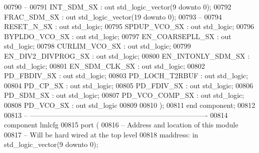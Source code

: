 \begin{DoxyCode}
00790 \textcolor{keyword}{        --}
00791         INT\_SDM\_SX  : \textcolor{keywordflow}{out} \textcolor{comment}{std\_logic\_vector}(\textcolor{vhdllogic}{}\textcolor{vhdllogic}{9} \textcolor{keywordflow}{downto} \textcolor{vhdllogic}{}\textcolor{vhdllogic}{0});
00792         FRAC\_SDM\_SX : \textcolor{keywordflow}{out} \textcolor{comment}{std\_logic\_vector}(\textcolor{vhdllogic}{}\textcolor{vhdllogic}{19} \textcolor{keywordflow}{downto} \textcolor{vhdllogic}{}\textcolor{vhdllogic}{0});
00793 \textcolor{keyword}{        --}
00794         RESET\_N\_SX                  : \textcolor{keywordflow}{out} \textcolor{comment}{std\_logic};
00795         SPDUP\_VCO\_SX                : \textcolor{keywordflow}{out} \textcolor{comment}{std\_logic};
00796         BYPLDO\_VCO\_SX               : \textcolor{keywordflow}{out} \textcolor{comment}{std\_logic};
00797         EN\_COARSEPLL\_SX         : \textcolor{keywordflow}{out} \textcolor{comment}{std\_logic};
00798         CURLIM\_VCO\_SX               : \textcolor{keywordflow}{out} \textcolor{comment}{std\_logic};
00799         EN\_DIV2\_DIVPROG\_SX  : \textcolor{keywordflow}{out} \textcolor{comment}{std\_logic};
00800         EN\_INTONLY\_SDM\_SX       : \textcolor{keywordflow}{out} \textcolor{comment}{std\_logic};
00801         EN\_SDM\_CLK\_SX               : \textcolor{keywordflow}{out} \textcolor{comment}{std\_logic};
00802         PD\_FBDIV\_SX             : \textcolor{keywordflow}{out} \textcolor{comment}{std\_logic};
00803         PD\_LOCH\_T2RBUF          : \textcolor{keywordflow}{out} \textcolor{comment}{std\_logic};
00804         PD\_CP\_SX                        : \textcolor{keywordflow}{out} \textcolor{comment}{std\_logic};
00805         PD\_FDIV\_SX                  : \textcolor{keywordflow}{out} \textcolor{comment}{std\_logic};
00806         PD\_SDM\_SX                       : \textcolor{keywordflow}{out} \textcolor{comment}{std\_logic};
00807         PD\_VCO\_COMP\_SX          : \textcolor{keywordflow}{out} \textcolor{comment}{std\_logic};
00808         PD\_VCO\_SX                       : \textcolor{keywordflow}{out} \textcolor{comment}{std\_logic}     
00809 
00810     );
00811 \textcolor{keywordflow}{end} \textcolor{keywordflow}{component};
00812 
00813 \textcolor{keyword}{-- ----------------------------------------------------------------------------}
00814 \textcolor{keywordflow}{component} lmlcfg
00815     \textcolor{keywordflow}{port} (
00816 \textcolor{keyword}{        -- Address and location of this module}
00817 \textcolor{keyword}{        -- Will be hard wired at the top level}
00818         maddress: \textcolor{keywordflow}{in} \textcolor{comment}{std\_logic\_vector}(\textcolor{vhdllogic}{}\textcolor{vhdllogic}{9} \textcolor{keywordflow}{downto} \textcolor{vhdllogic}{}\textcolor{vhdllogic}{0});

\end{DoxyCode}
